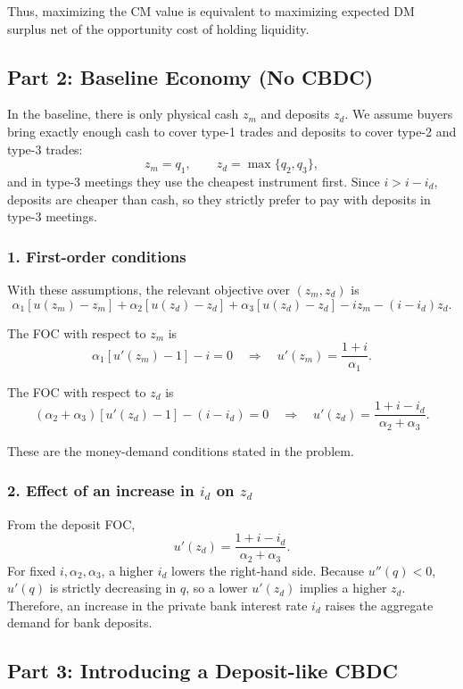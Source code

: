 \documentclass[11pt, a4paper]{article}
\begin{document}
Thus, maximizing the CM value is equivalent to maximizing expected DM surplus net of the opportunity cost of holding liquidity.

\subsection*{Part 2: Baseline Economy (No CBDC)}

In the baseline, there is only physical cash $z_m$ and deposits $z_d$.  
We assume buyers bring exactly enough cash to cover type-1 trades and deposits to cover type-2 and type-3 trades:
\[
z_m = q_1, \qquad z_d = \max\{q_2,q_3\},
\]
and in type-3 meetings they use the cheapest instrument first.  
Since $i > i - i_d$, deposits are cheaper than cash, so they strictly prefer to pay with deposits in type-3 meetings.

\subsubsection*{1. First-order conditions}

With these assumptions, the relevant objective over $(z_m,z_d)$ is
\[
\alpha_1[u(z_m)-z_m]
+ \alpha_2[u(z_d)-z_d]
+ \alpha_3[u(z_d)-z_d]
- i z_m - (i - i_d) z_d.
\]

The FOC with respect to $z_m$ is
\[
\alpha_1[u'(z_m)-1] - i = 0
\quad\Longrightarrow\quad
u'(z_m) = \frac{1+i}{\alpha_1}.
\]

The FOC with respect to $z_d$ is
\[
(\alpha_2+\alpha_3)[u'(z_d)-1] - (i - i_d) = 0
\quad\Longrightarrow\quad
u'(z_d) = \frac{1 + i - i_d}{\alpha_2+\alpha_3}.
\]

These are the money-demand conditions stated in the problem.

\subsubsection*{2. Effect of an increase in $i_d$ on $z_d$}

From the deposit FOC,
\[
u'(z_d) = \frac{1 + i - i_d}{\alpha_2+\alpha_3}.
\]
For fixed $i,\alpha_2,\alpha_3$, a higher $i_d$ lowers the right-hand side.  
Because $u''(q)<0$, $u'(q)$ is strictly decreasing in $q$, so a lower $u'(z_d)$ implies a higher $z_d$.  
Therefore, an increase in the private bank interest rate $i_d$ raises the aggregate demand for bank deposits.

\subsection*{Part 3: Introducing a Deposit-like CBDC}
\end{document}
